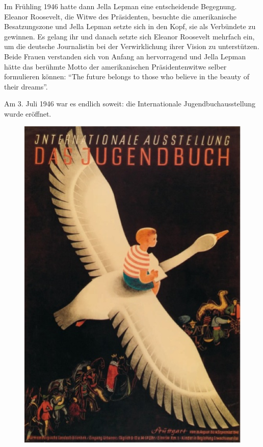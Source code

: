 \documentclass[a4paper,
fontsize=11pt,
oneside,
numbers=noperiodatend,
parskip=half-,
bibliography=totoc,
final
]{scrartcl}
\begin{document}
Im Frühling 1946 hatte dann Jella Lepman eine entscheidende Begegnung.
Eleanor Roosevelt, die Witwe des Präsidenten, besuchte die amerikanische
Besatzungszone und Jella Lepman setzte sich in den Kopf, sie als
Verbündete zu gewinnen. Es gelang ihr und danach setzte sich Eleanor
Roosevelt mehrfach ein, um die deutsche Journalistin bei der
Verwirklichung ihrer Vision zu unterstützen. Beide Frauen verstanden
sich von Anfang an hervorragend und Jella Lepman hätte das berühmte
Motto der amerikanischen Präsidentenwitwe selber formulieren können:
\enquote{The future belongs to those who believe in the beauty of their
dreams}.

Am 3. Juli 1946 war es endlich soweit: die Internationale
Jugendbuchausstellung wurde eröffnet.

\begin{figure}[htbp]
\centering
\includegraphics{img/bild4a.jpg}
\end{figure}
\end{document}
